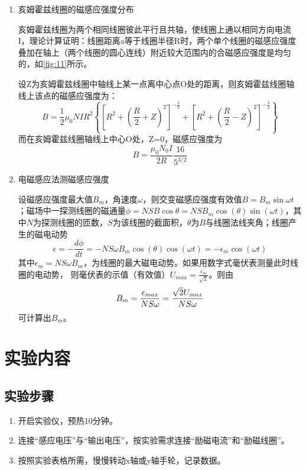 \documentclass[11pt]{article}
\begin{document}
\begin{enumerate}
    \item 亥姆霍兹线圈的磁感应强度分布
    \par \hspace*{2em }亥姆霍兹线圈为两个相同线圈彼此平行且共轴，使线圈上通以相同方向电流I，理论计算证明：线圈距离a等于线圈半径R时，两个单个线圈的磁感应强度叠加在轴上（两个线圈的圆心连线）附近较大范围内的合磁感应强度是均匀的，如\cref{fig:11}所示。
    \par \hspace*{2em }设Z为亥姆霍兹线圈中轴线上某一点离中心点O处的距离，则亥姆霍兹线圈轴线上该点的磁感应强度为：
    \begin{equation}
        B=\frac{1}{2}\mu_0 NIR^2\left\{{\left[R^2+\left(\frac{R}{2}+Z\right)^2\right]}^{-\frac{3}{2}}+{\left[R^2+\left(\frac{R}{2}-Z\right)^2\right]}^{-\frac{3}{2}}\right\}
    \end{equation}
    而在亥姆霍兹线圈轴线上中心O处，Z=0，磁感应强度为
    \begin{equation}
        B=\frac{\mu_0 N_0 I}{2R}\frac{16}{5^{3/2}}
    \end{equation}

    \item 电磁感应法测磁感应强度
    \par \hspace*{2em}设磁感应强度最大值$B_m$，角速度$\omega$，则交变磁感应强度有效值$B=B_m \sin \omega t$；磁场中一探测线圈的磁通量$\phi=NSB\cos \theta=NSB_m\cos(\theta) \sin(\omega t)$，其中$N$为探测线圈的匝数，$S$为该线圈的截面积，$\theta$为$B$与线圈法线夹角；线圈产生的磁电动势
    \begin{equation}
        \epsilon=-\frac{d\phi}{dt}=-NS\omega B_m\cos(\theta)\cos(\omega t)=-\epsilon_m \cos(\omega t)
    \end{equation}
    其中$\epsilon_m=NS\omega B_m$，为线圈的最大磁电动势。如果用数字式毫伏表测量此时线圈的电动势，
    则毫伏表的示值（有效值）$U_{max}=\frac{\epsilon_m}{\sqrt{2}}$。则由
    \begin{equation}{\label{equ:10}}
        B_m=\frac{\epsilon_{max}}{NS\omega}=\frac{\sqrt{2}U_{max}}{NS\omega}
    \end{equation}
    可计算出$B_m$。
\end{enumerate}
\section{实验内容}
\subsection{实验步骤}
\begin{enumerate}
    \item 开启实验仪，预热10分钟。
    \item 连接“感应电压”与“输出电压”，按实验需求连接“励磁电流”和“励磁线圈”。
    \item 按照实验表格所需，慢慢转动x轴或y轴手轮，记录数据。
\end{enumerate}
\end{document}

